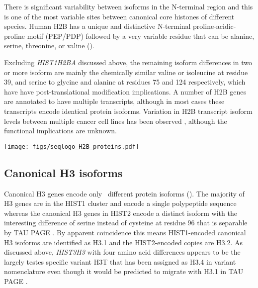     There is significant variability between isoforms in the N-terminal region
    and this is one of the most variable sites between canonical
    core histones of different species.
    Human H2B has a unique and distinctive N-terminal proline-acidic-proline motif (PEP/PDP)
    followed by a very variable residue that can be alanine, serine,
    threonine, or valine ().

    Excluding \textit{HIST1H2BA} discussed above,
    the remaining isoform differences in two or more isoform are mainly the chemically
    similar valine or isoleucine at residue 39,
    and serine to glycine and alanine at residues 75 and 124 respectively,
    which have have post-translational modification implications.
    A number of H2B genes are annotated to have multiple transcripts,
    although in most cases these transcripts encode identical protein isoforms.
    Variation in H2B transcript isoform levels between multiple cancer cell
    lines has been observed \citep{Molden2015},
    although the functional implications are unknown.

    \begin{table}
      \caption{%
        Canonical H2B encoded protein isoforms.
        Upper panel shows isoform variations relative to most common isoform
        using HGVS recommended nomenclature \citep{mutnomenclature2016}.
        For clarity, isoforms encoded by multiple transcripts of a single gene
        are distingushed by a numerical suffix (see ).
        Lower panel shows sequence logo of all isoforms aligned
        with invariant residues in grey.
      }
      \label{tab:H2B-consensus}
      
      \texttt{[image: figs/seqlogo\_H2B\_proteins.pdf]}
    \end{table}

  \subsection{Canonical H3 isoforms}
    Canonical H3 genes encode only \HThreeUniqueProteins{}~different
    protein isoforms ().
    The majority of H3 genes are in the HIST1 cluster and encode a
    single polypeptide sequence \citep{Ederveen2011}
    whereas the canonical H3 genes in HIST2 encode a distinct isoform
    with the interesting difference of serine instead of cysteine at residue 96
    that is separable by TAU PAGE \citep{FranklinZweidler1977}.
    By apparent coincidence this means HIST1-encoded canonical H3 isoforms are
    identified as H3.1 and the HIST2-encoded copies are H3.2.
    As discussed above, \textit{HIST3H3} with four amino acid differences
    appears to be the largely testes specific variant H3T
    that has been assigned as H3.4 in variant nomenclature \citep{Talbert2012}
    even though it would be predicted to migrate with H3.1 in TAU PAGE \citep{FranklinZweidler1977}.

